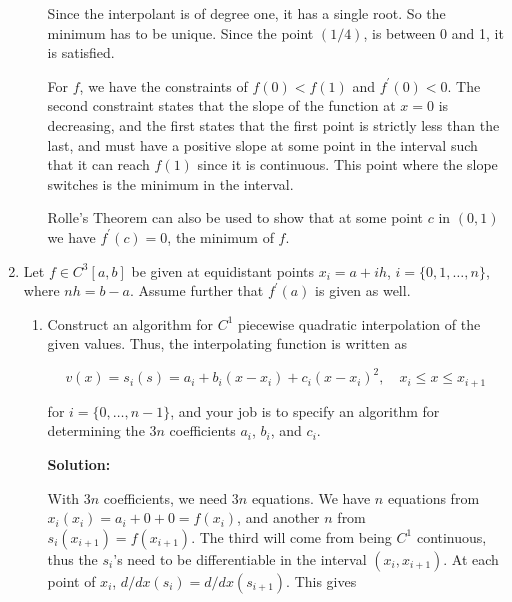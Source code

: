 \documentclass[12pt]{article}
\renewcommand{\P}[1]{\left( #1 \right)}
\begin{document}
\begin{enumerate}
\begin{enumerate}
  Since the interpolant is of degree one, it has a single root. So the minimum
  has to be unique. Since the point $(1/4)$, is between 0 and 1, it is satisfied.

  For $f$, we have the constraints of $f(0) < f(1)$ and $f^{\prime}(0) < 0$. The
  second constraint states that the slope of the function at $x=0$ is decreasing,
  and the first states that the first point is strictly less than the last, and
  must have a positive slope at some point in the interval such that it can reach
  $f(1)$ since it is continuous. This point where the slope switches is the minimum
  in the interval.

  Rolle's Theorem can also be used to show that at some point $c$ in $(0, 1)$ we
  have $f^{\prime}(c) = 0$, the minimum of $f$.

\end{enumerate}

\item Let $f \in C^{3}[a,b]$ be given at equidistant points $x_{i} = a + ih$, $i = \{0,1,\ldots,n\}$,
where $nh = b-a$. Assume further that $f^{\prime}(a)$ is given as well.

\begin{enumerate}
  \item Construct an algorithm for $C^{1}$ piecewise quadratic interpolation of the
  given values. Thus, the interpolating function is written as

  \[
    v(x) = s_{i}(s) = a_{i} + b_{i}\left( x - x_{i}\right) + c_{i}\left( x-x_{i}\right)^{2},\quad x_{i} \leq x \leq x_{i+1}
  \]

  for $i = \{0,\ldots,n-1\}$, and your job is to specify an algorithm for determining
  the $3n$ coefficients $a_{i}$, $b_{i}$, and $c_{i}$.

  {\bf Solution:}

  With $3n$ coefficients, we need $3n$ equations. We have $n$ equations from
  $x_{i}\P{x_{i}} = a_{i} + 0 + 0 = f\P{x_{i}}$, and another $n$ from
  $s_{i}\P{x_{i+1}} = f\P{x_{i+1}}$. The third will come from being $C^{1}$
  continuous, thus the $s_{i}$'s need to be differentiable in the interval
  $\P{x_{i}, x_{i+1}}$. At each point of $x_{i}$, $d/dx\P{s_{i}} = d/dx\P{s_{i+1}}$. This gives


\end{enumerate}
\end{enumerate}
\end{document}
